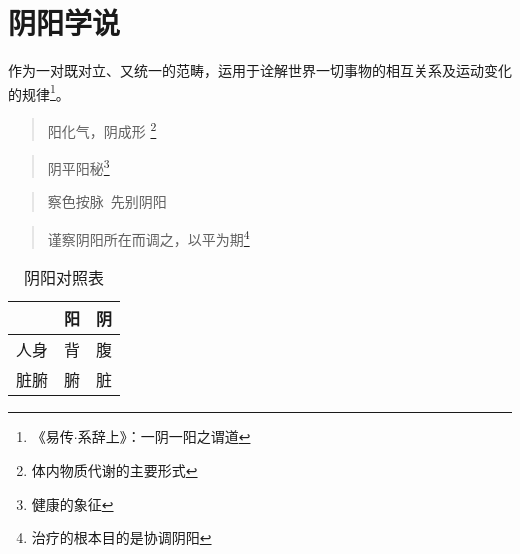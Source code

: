 \section{阴阳学说}
作为一对既对立、又统一的范畴，运用于诠解世界一切事物的相互关系及运动变化的规律\footnote{《易传$\cdot$系辞上》：一阴一阳之谓道}。

\begin{quote}
  阳化气，阴成形 \footnote{体内物质代谢的主要形式}
\end{quote}
\begin{quote}
  阴平阳秘\footnote{健康的象征}
\end{quote}
\begin{quote}
  察色按脉\ 先别阴阳
\end{quote}
\begin{quote}
  谨察阴阳所在而调之，以平为期\footnote{治疗的根本目的是协调阴阳}
\end{quote}

\begin{table}[H]
  \centering
  \caption[]{阴阳对照表}
  \begin{tabular}{|c|c|c|}
    \hline & 阳 & 阴 \\
    \hline 人身 & 背 & 腹 \\
    \hline 脏腑 & 腑 & 脏\\
    \hline
  \end{tabular}
\end{table}
